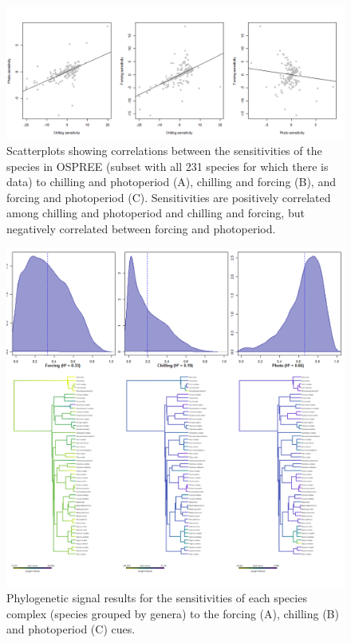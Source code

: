 \documentclass{article}\usepackage[]{graphicx}\usepackage[]{color}
\begin{document}
\begin{figure} [H]
  \begin{center}
  \includegraphics[width=14cm]{..//..//analyses/phylogeny/figures/cues_sensit_correlations_231spp.png}
  \caption{Scatterplots showing correlations between the sensitivities of the species in OSPREE (subset with all 231 species for which there is data) to chilling and photoperiod (A), chilling and forcing (B), and forcing and photoperiod (C). Sensitivities are positively correlated among chilling and photoperiod and chilling and forcing, but negatively correlated between forcing and photoperiod.}
  \label{fig:sensicorrs231}
  \end{center}
\end{figure}


\clearpage
\begin{figure} [H]
  \begin{center}
  \includegraphics[width=14cm]{..//..//analyses/phylogeny/figures/Sensitivities_phylosig.png}
  \caption{Phylogenetic signal results for the sensitivities of each species complex (species grouped by genera) to the forcing (A), chilling (B) and photoperiod (C) cues.}
  \label{fig:phylosig_complex}
\end{center}
\end{figure}
\end{document}
